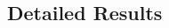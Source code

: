 \documentclass[11pt]{article}
\begin{document}
\begin{CJK}{UTF8}{gbsn}

\newpage

\section{Detailed Results}
\label{sec:det_res}


\end{CJK}
\end{document}

